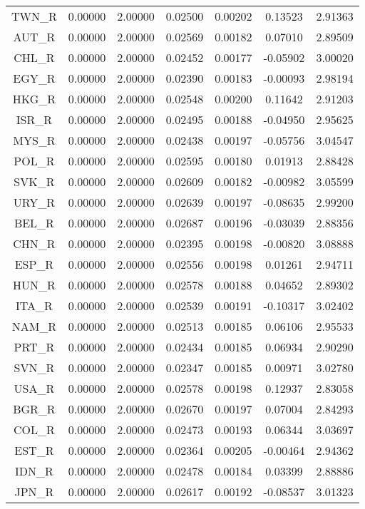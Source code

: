 \begin{longtable}{c c c c c c c}
TWN_R & 0.00000 & 2.00000 & 0.02500 & 0.00202 & 0.13523 & 2.91363 \\
AUT_R & 0.00000 & 2.00000 & 0.02569 & 0.00182 & 0.07010 & 2.89509 \\
CHL_R & 0.00000 & 2.00000 & 0.02452 & 0.00177 & -0.05902 & 3.00020 \\
EGY_R & 0.00000 & 2.00000 & 0.02390 & 0.00183 & -0.00093 & 2.98194 \\
HKG_R & 0.00000 & 2.00000 & 0.02548 & 0.00200 & 0.11642 & 2.91203 \\
ISR_R & 0.00000 & 2.00000 & 0.02495 & 0.00188 & -0.04950 & 2.95625 \\
MYS_R & 0.00000 & 2.00000 & 0.02438 & 0.00197 & -0.05756 & 3.04547 \\
POL_R & 0.00000 & 2.00000 & 0.02595 & 0.00180 & 0.01913 & 2.88428 \\
SVK_R & 0.00000 & 2.00000 & 0.02609 & 0.00182 & -0.00982 & 3.05599 \\
URY_R & 0.00000 & 2.00000 & 0.02639 & 0.00197 & -0.08635 & 2.99200 \\
BEL_R & 0.00000 & 2.00000 & 0.02687 & 0.00196 & -0.03039 & 2.88356 \\
CHN_R & 0.00000 & 2.00000 & 0.02395 & 0.00198 & -0.00820 & 3.08888 \\
ESP_R & 0.00000 & 2.00000 & 0.02556 & 0.00198 & 0.01261 & 2.94711 \\
HUN_R & 0.00000 & 2.00000 & 0.02578 & 0.00188 & 0.04652 & 2.89302 \\
ITA_R & 0.00000 & 2.00000 & 0.02539 & 0.00191 & -0.10317 & 3.02402 \\
NAM_R & 0.00000 & 2.00000 & 0.02513 & 0.00185 & 0.06106 & 2.95533 \\
PRT_R & 0.00000 & 2.00000 & 0.02434 & 0.00185 & 0.06934 & 2.90290 \\
SVN_R & 0.00000 & 2.00000 & 0.02347 & 0.00185 & 0.00971 & 3.02780 \\
USA_R & 0.00000 & 2.00000 & 0.02578 & 0.00198 & 0.12937 & 2.83058 \\
BGR_R & 0.00000 & 2.00000 & 0.02670 & 0.00197 & 0.07004 & 2.84293 \\
COL_R & 0.00000 & 2.00000 & 0.02473 & 0.00193 & 0.06344 & 3.03697 \\
EST_R & 0.00000 & 2.00000 & 0.02364 & 0.00205 & -0.00464 & 2.94362 \\
IDN_R & 0.00000 & 2.00000 & 0.02478 & 0.00184 & 0.03399 & 2.88886 \\
JPN_R & 0.00000 & 2.00000 & 0.02617 & 0.00192 & -0.08537 & 3.01323 \\

\end{longtable}
